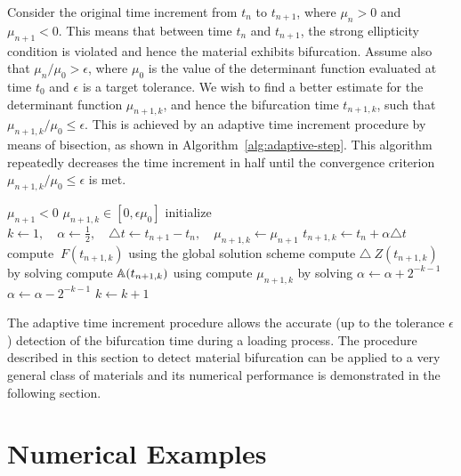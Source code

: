 \documentclass[12pt]{article}
\numberwithin{equation}{section}
\begin{document}
Consider the original time increment from $t_n$ to $t_{n+1}$, where
$\mu_n > 0$ and $\mu_{n+1} < 0$. This means that between time $t_n$
and $t_{n+1}$, the strong ellipticity condition is violated and hence
the material exhibits bifurcation. Assume also that
$\mu_n / \mu_0 > \epsilon$, where $\mu_0$ is the value of the
determinant function evaluated at time $t_0$ and $\epsilon$ is a
target tolerance. We wish to find a better estimate for the
determinant function $\mu_{n+1,k}$, and hence the bifurcation time
$t_{n+1,k}$, such that $\mu_{n+1,k} / \mu_0 \le \epsilon$. This is
achieved by an adaptive time increment procedure by means of
bisection, as shown in Algorithm~\ref{alg:adaptive-step}. This
algorithm repeatedly decreases the time increment in half until the
convergence criterion $\mu_{n+1,k} / \mu_0 \le \epsilon$ is met.

\begin{algorithm}[!htbp]
  \caption{$\text{AdaptiveStep}(\mu_0, \mu_{n+1}, t_{n+1}, \epsilon)$}
  \begin{algorithmic}
    \REQUIRE $\mu_{n+1} < 0$
    \ENSURE $\mu_{n+1,k} \in [0, \epsilon \mu_0]$
    \STATE initialize
    $k \leftarrow 1,
    \quad
    \alpha \leftarrow \frac{1}{2},
    \quad
    \triangle t \leftarrow t_{n+1} - t_n,
    \quad
    \mu_{n+1,k} \leftarrow \mu_{n+1}$
    \STATE $t_{n+1,k} \leftarrow t_n + \alpha \triangle t$
    \STATE compute $~F(t_{n+1,k})$ using the global solution scheme
    \STATE compute $\triangle ~Z(t_{n+1,k})$
    by solving 
    \STATE compute $\mathbb{A}(t_{n+1,k})$
    using 
    \STATE compute $\mu_{n+1,k}$
    by solving 
    \STATE $\alpha \leftarrow \alpha + 2^{-k-1}$
    \ELSE
    \STATE $\alpha \leftarrow \alpha - 2^{-k-1}$
    \ENDIF
    \STATE $k \leftarrow k+1$
    \ENDWHILE
  \end{algorithmic}
  \label{alg:adaptive-step}
\end{algorithm}

The adaptive time increment procedure allows the accurate (up to the
tolerance $\epsilon$) detection of the bifurcation time during a
loading process. The procedure described in this section to detect
material bifurcation can be applied to a very general class of
materials and its numerical performance is demonstrated in the
following section.

\section{Numerical Examples}
\label{sec:numerical-examples}
\end{document}
